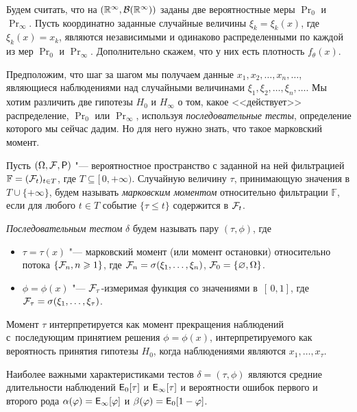 Будем считать, что на \((\mathbb{R}^{\infty}, \mathcal{B}(\mathbb{R}^{\infty}))\) заданы две вероятностные меры \(\Pr_{0}\) 
и \(\Pr_{\infty}\). Пусть координатно заданные случайные величины \(\xi_{k} = \xi_{k}(x)\), где
\(\xi_k(x) = x_k\), являются независимыми и одинаково распределенными по каждой из мер \(\Pr_0\) и 
\(\Pr_{\infty}\). Дополнительно скажем, что у них есть плотность \(f_{\theta}(x)\).

Предположим, что шаг за шагом мы получаем данные \(x_{1}, x_{2}, \ldots, x_{n}, \ldots\), 
являющиеся наблюдениями над случайными величинами \(\xi_{1}, \xi_{2}, \ldots, \xi_{n}, \ldots\). Мы 
хотим  различить две гипотезы $H_0$ и $H_{\infty}$ о том, какое <<действует>> распределение, 
$\Pr_0$ или $\Pr_{\infty}$, используя \emph{последовательные тесты}, определение которого мы сейчас 
дадим. Но для него нужно знать, что такое марковский момент.

\begin{definition}\label{def:markov-stopping-moment}
	Пусть \((\Omega, \F, \Pr)\) "--- вероятностное пространство с заданной на ней фильтрацией 
	\(\mathbb{F} = (\mathcal{F}_{t})_{t \in T}\), где \(T \subseteq [\,0, +\infty)\). Случайную величину 
	\(\tau\), принимающую значения в \(T \cup \{+\infty\}\), будем называть \emph{марковским 
	моментом} относительно фильтрации \(\mathbb{F}\), если для любого \(t \in T\) событие \(\{\tau 
	\leq t\}\) содержится в 
	\(\mathcal{F}_{t}\). 
\end{definition}
\begin{definition}
	\emph{Последовательным тестом} \(\delta\) будем называть пару \((\tau, \phi)\), где
	\begin{itemize}
		\item \(\tau = \tau(x)\) "--- марковский момент (или момент остановки) относительно потока 
		\(\{\mathcal{F}_{n}, n \geqslant 1\}\), где \(\mathcal{F}_{n} = \sigma(\xi_{1},\ldots, \xi_{n})\), \(\mathcal{F}_{0} = 
		\{\varnothing, \Omega\}\).
		
		\item \(\phi = \phi(x)\) "--- \(\mathcal{F}_{\tau}\)-измеримая функция со значениями в~\([\,0,1]\), 
		где \(\mathcal{F}_{\tau} = \sigma(\xi_{1}, \ldots, \xi_{\tau})\).
	\end{itemize}
\end{definition}
Момент \(\tau\) интерпретируется как момент прекращения наблюдений с~последующим принятием решения 
\(\phi = \phi(x)\), интерпретируемого как вероятность принятия гипотезы \(H_{0}\), когда 
наблюдениями являются \(x_1, \ldots, x_{\tau}\).

Наиболее важными характеристиками тестов \(\delta = (\tau, \phi)\)
являются средние длительности наблюдений \(\E_{0}[\tau]\) и \(\E_{\infty}[\tau]\) и вероятности 
ошибок первого и второго рода \(\alpha(\phi) = \E_{\infty}[\phi]\) и \(\beta(\phi) = \E_{0}[1 - 
\phi]\).


